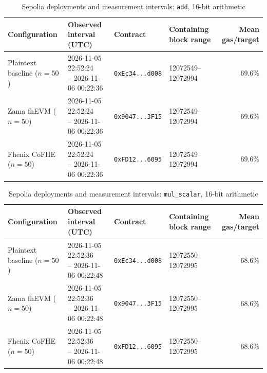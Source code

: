 \begin{table}[!t]
\caption{Sepolia deployments and measurement intervals: \texttt{add}, 16-bit arithmetic}
\label{tab:sepolia-experiment-deployments-classic-euint16-add}
\centering
\footnotesize
\setlength{\tabcolsep}{4pt}
\begin{tabular}{|l|l|l|l|r|}
\hline
\textbf{Configuration} &
\textbf{Observed interval (UTC)} &
\textbf{Contract} &
\textbf{Containing block range} &
\textbf{Mean gas/target} \\
\hline
Plaintext baseline (\(n=50\)) &
\shortstack[l]{2026-11-05 22:52:24 \\ -- 2026-11-06 00:22:36} &
\texttt{0xEc34...d008} &
12072549--12072994 &
69.6\% \\
\hline
Zama fhEVM (\(n=50\)) &
\shortstack[l]{2026-11-05 22:52:24 \\ -- 2026-11-06 00:22:36} &
\texttt{0x9047...3F15} &
12072549--12072994 &
69.6\% \\
\hline
Fhenix CoFHE (\(n=50\)) &
\shortstack[l]{2026-11-05 22:52:24 \\ -- 2026-11-06 00:22:36} &
\texttt{0xFD12...6095} &
12072549--12072994 &
69.6\% \\
\hline
\end{tabular}
\end{table}

\begin{table}[!t]
\caption{Sepolia deployments and measurement intervals: \texttt{mul\_scalar}, 16-bit arithmetic}
\label{tab:sepolia-experiment-deployments-classic-euint16-mul-scalar}
\centering
\footnotesize
\setlength{\tabcolsep}{4pt}
\begin{tabular}{|l|l|l|l|r|}
\hline
\textbf{Configuration} &
\textbf{Observed interval (UTC)} &
\textbf{Contract} &
\textbf{Containing block range} &
\textbf{Mean gas/target} \\
\hline
Plaintext baseline (\(n=50\)) &
\shortstack[l]{2026-11-05 22:52:36 \\ -- 2026-11-06 00:22:48} &
\texttt{0xEc34...d008} &
12072550--12072995 &
68.6\% \\
\hline
Zama fhEVM (\(n=50\)) &
\shortstack[l]{2026-11-05 22:52:36 \\ -- 2026-11-06 00:22:48} &
\texttt{0x9047...3F15} &
12072550--12072995 &
68.6\% \\
\hline
Fhenix CoFHE (\(n=50\)) &
\shortstack[l]{2026-11-05 22:52:36 \\ -- 2026-11-06 00:22:48} &
\texttt{0xFD12...6095} &
12072550--12072995 &
68.6\% \\
\hline
\end{tabular}
\end{table}

